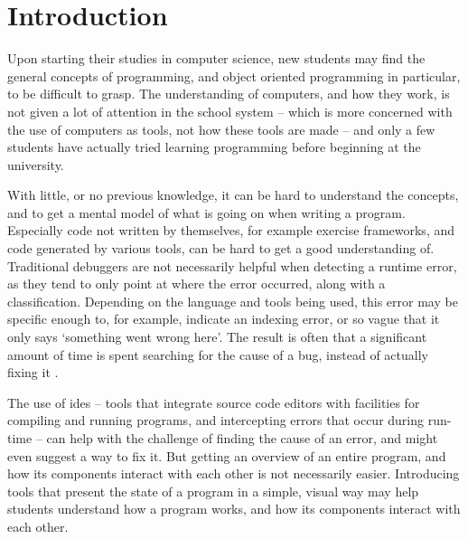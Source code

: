 \chapter{Introduction}\label{introduction}

Upon starting their studies in computer science, new students may find the general concepts of programming, and object oriented programming in particular, to be difficult to grasp.
The understanding of computers, and how they work, is not given a lot of attention in the school system -- which is more concerned with the use of computers as tools, not how these tools are made -- and only a few students have actually tried learning programming before beginning at the university. %

With little, or no previous knowledge, it can be hard to understand the concepts, and to get a mental model of what is going on when writing a program.
Especially code not written by themselves, for example exercise frameworks, and code generated by various tools, can be hard to get a good understanding of.
Traditional debuggers are not necessarily helpful when detecting a runtime error, as they tend to only point at where the error occurred, along with a classification.
Depending on the language and tools being used, this error may be specific enough to, for example, indicate an indexing error, or so vague that it only says `something went wrong here'.
The result is often that a significant amount of time is spent searching for the cause of a bug, instead of actually fixing it \cite{ko2006}. %

The use of \glspl{ide} -- tools that integrate source code editors with facilities for compiling and running programs, and intercepting errors that occur during run-time -- can help with the challenge of finding the cause of an error, and might even suggest a way to fix it.
But getting an overview of an entire program, and how its components interact with each other is not necessarily easier.
Introducing tools that present the state of a program in a simple, visual way may help students understand how a program works, and how its components interact with each other.

